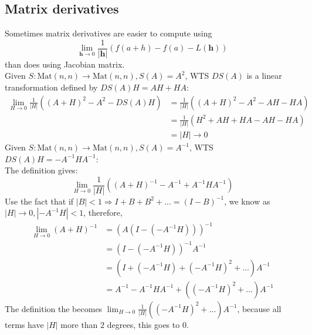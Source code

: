 \documentclass{article}
\begin{document}
\subsection{Matrix derivatives}
Sometimes matrix derivatives are easier to compute using
\begin{equation*}
    \lim_{\mathbf{h}\rightarrow 0}\frac{1}{|\mathbf{h}|}(
        f(a+h)- f(a) - L(\mathbf{h})
    )
\end{equation*} than does using Jacobian matrix.\\
Given $S: \mathrm{Mat}(n, n) \rightarrow \mathrm{Mat}(n, n), S(A) = A^2$, WTS $DS(A)$ is a linear transformation defined by $DS(A)H = AH + HA$:\\
\begin{equation*}
    \begin{split}
        \lim_{H\rightarrow 0} \frac{1}{|H|}((A+H)^2 - A^2 - DS(A)H) &= \frac{1}{|H|}((A+H)^2 - A^2 - AH - HA)\\
        &= \frac{1}{|H|}(H^2 + AH + HA - AH - HA)\\
        &= |H| \rightarrow 0
    \end{split}
\end{equation*}
Given $S: \mathrm{Mat}(n, n) \rightarrow \mathrm{Mat}(n, n), S(A) = A^{-1}$, WTS $DS(A)H = -A^{-1}HA^{-1}$:\\
The definition gives:
\begin{equation*}
    \lim_{H\rightarrow 0}\frac{1}{|H|}((A+H)^{-1} - A^{-1} + A^{-1}HA^{-1})
\end{equation*}
Use the fact that if $|B| < 1 \Rightarrow I + B + B^2 + ... = (I-B)^{-1}$, we know as $|H| \rightarrow 0, |-A^{-1}H| < 1$, therefore,
\begin{equation*}
   \begin{split}
        \lim_{H\rightarrow 0}(A+H)^{-1} &= (A (I - (-A^{-1}H)))^{-1}\\
        &= (I - (-A^{-1}H))^{-1}A^{-1}\\
        &= (I + (-A^{-1}H) + (-A^{-1}H)^2 + ...)A^{-1}\\
        &= A^{-1} - A^{-1}HA^{-1} + ((-A^{-1}H)^2 + ...)A^{-1}
   \end{split} 
\end{equation*}
The definition the becomes $\lim_{H\rightarrow 0}\frac{1}{|H|}((-A^{-1}H)^2 + ...)A^{-1}$, because all terms have $|H|$ more than $2$ degrees, this goes to $0$.
\end{document}

